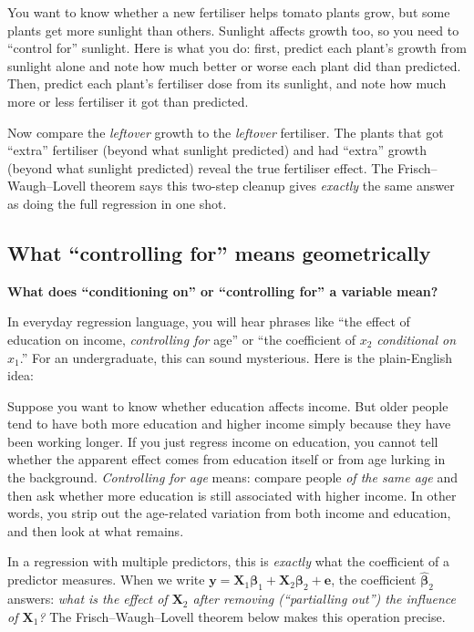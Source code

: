 \documentclass[11pt,a4paper]{article}
\theoremstyle{plain}
\theoremstyle{definition}
\newcommand{\bhat}{\hat{\bm{\beta}}}
\newcommand{\bX}{\bm{X}}
\newcommand{\by}{\bm{y}}
\newcommand{\be}{\bm{e}}
\begin{document}
\begin{toystory}
You want to know whether a new fertiliser helps tomato plants grow, but
some plants get more sunlight than others.  Sunlight affects growth too,
so you need to ``control for'' sunlight.  Here is what you do: first,
predict each plant's growth from sunlight alone and note how much better
or worse each plant did than predicted.  Then, predict each plant's
fertiliser dose from its sunlight, and note how much more or less
fertiliser it got than predicted.

Now compare the \emph{leftover} growth to the \emph{leftover}
fertiliser.  The plants that got ``extra'' fertiliser (beyond what
sunlight predicted) and had ``extra'' growth (beyond what sunlight
predicted) reveal the true fertiliser effect.  The Frisch--Waugh--Lovell
theorem says this two-step cleanup gives \emph{exactly} the same answer
as doing the full regression in one shot.
\end{toystory}

\subsection{What ``controlling for'' means geometrically}

\noindent\textbf{What does ``conditioning on'' or ``controlling for'' a variable mean?}

In everyday regression language, you will hear phrases like
``the effect of education on income, \emph{controlling for} age'' or
``the coefficient of $x_2$ \emph{conditional on} $x_1$.''
For an undergraduate, this can sound mysterious.
Here is the plain-English idea:

Suppose you want to know whether education affects income.
But older people tend to have both more education and higher income simply because they have been working longer.
If you just regress income on education, you cannot tell whether the apparent effect comes from education itself or from age lurking in the background.
\emph{Controlling for age} means: compare people \emph{of the same age} and then ask whether more education is still associated with higher income.
In other words, you strip out the age-related variation from both income and education, and then look at what remains.

In a regression with multiple predictors, this is \emph{exactly} what the
coefficient of a predictor measures. When we write
$\by = \bX_1\bm{\beta}_1 + \bX_2\bm{\beta}_2 + \be$,
the coefficient $\bhat_2$ answers: \emph{what is the effect of $\bX_2$
after removing (``partialling out'') the influence of $\bX_1$?}
The Frisch--Waugh--Lovell theorem below makes this operation precise.
\end{document}
